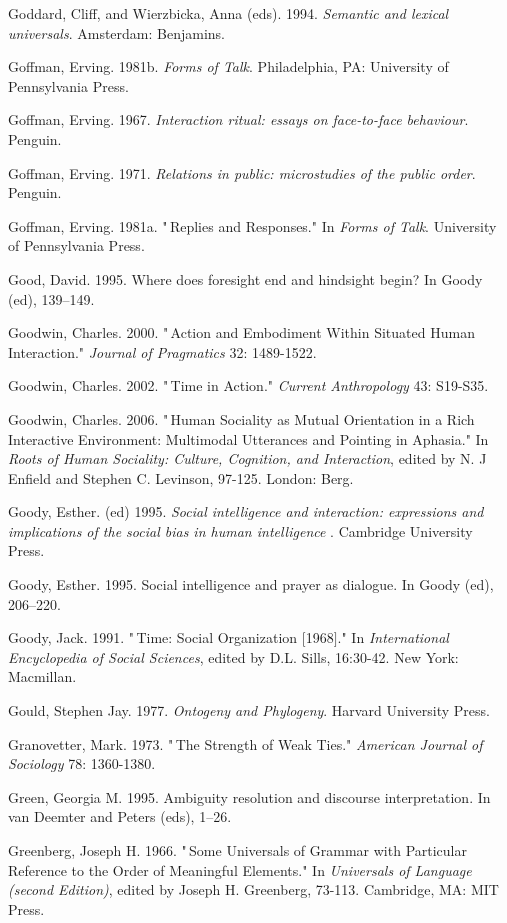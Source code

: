 Goddard, Cliff, and Wierzbicka, Anna (eds). 1994. \textit{Semantic and 
lexical universals}. Amsterdam: Benjamins.

Goffman, Erving. 1981b. \textit{Forms of Talk}. Philadelphia, PA: 
University of Pennsylvania Press.

Goffman, Erving. 1967. \textit{Interaction ritual: essays on 
face-to-face behaviour}. Penguin.

Goffman, Erving. 1971. \textit{Relations in public: microstudies of the 
public order}. Penguin.

Goffman, Erving. 1981a. "\,Replies and Responses." In \textit{Forms of 
Talk}. University of Pennsylvania Press.

Good, David. 1995. Where does foresight end and hindsight begin? In 
Goody (ed), 139--149.

Goodwin, Charles. 2000. "\,Action and Embodiment Within Situated Human 
Interaction." \textit{Journal of Pragmatics} 32: 1489-1522.

Goodwin, Charles. 2002. "\,Time in Action." \textit{Current 
Anthropology} 43: S19-S35.

Goodwin, Charles. 2006. "\,Human Sociality as Mutual Orientation in a 
Rich Interactive Environment: Multimodal Utterances and Pointing in 
Aphasia." In \textit{Roots of Human Sociality: Culture, Cognition, and 
Interaction}, edited by N. J Enfield and Stephen C. Levinson, 97-125. 
London: Berg.

Goody, Esther. (ed) 1995. \textit{Social intelligence and interaction: 
expressions and implications of the social bias in human intelligence}
. Cambridge University Press.

Goody, Esther. 1995. Social intelligence and prayer as dialogue. In 
Goody (ed), 206--220.

Goody, Jack. 1991. "\,Time: Social Organization $[$1968$]$." In \textit{
International Encyclopedia of Social Sciences}, edited by D.L. Sills, 
16:30-42. New York: Macmillan.

Gould, Stephen Jay. 1977. \textit{Ontogeny and Phylogeny}. Harvard 
University Press.

Granovetter, Mark. 1973. "\,The Strength of Weak Ties." \textit{
American Journal of Sociology} 78: 1360-1380.

Green, Georgia M. 1995. Ambiguity resolution and discourse 
interpretation. In van Deemter and Peters (eds), 1--26. 

Greenberg, Joseph H. 1966. "\,Some Universals of Grammar with Particular 
Reference to the Order of Meaningful Elements." In \textit{Universals 
of Language (second Edition)}, edited by Joseph H. Greenberg, 73-113. 
Cambridge, MA: MIT Press.

